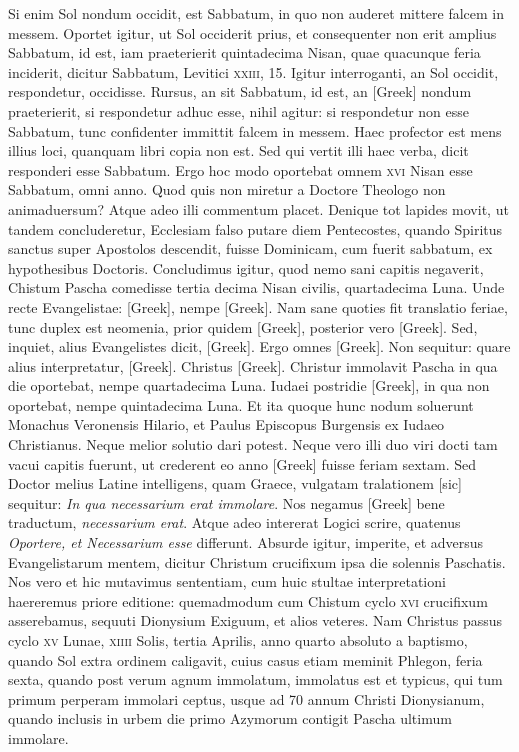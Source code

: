 Si enim Sol nondum occidit, est Sabbatum,
in quo non auderet mittere falcem in messem.
Oportet igitur,
ut Sol occiderit prius, et consequenter non erit amplius Sabbatum,
id est, iam praeterierit quintadecima Nisan, quae quacunque feria
inciderit, dicitur Sabbatum, Levitici \textsc{xxiii}, 15.
Igitur interroganti,
an Sol occidit, respondetur, occidisse.
Rursus, an sit Sabbatum, id
est, an \textgreek{[Greek]} nondum praeterierit, si respondetur adhuc
esse, nihil agitur: si respondetur non esse Sabbatum, tunc confidenter
immittit falcem in messem.
Haec profector est mens illius loci,
quanquam libri copia non est.
Sed qui vertit illi haec verba, dicit responderi
esse Sabbatum.
Ergo hoc modo oportebat omnem \textsc{xvi}
Nisan esse Sabbatum, omni anno.
Quod quis non miretur a Doctore
Theologo non animaduersum?
Atque adeo illi commentum
placet.
Denique tot lapides movit, ut tandem concluderetur, Ecclesiam
falso putare diem Pentecostes, quando Spiritus sanctus super
Apostolos descendit, fuisse Dominicam, cum fuerit sabbatum, ex
hypothesibus Doctoris.
Concludimus igitur, quod nemo sani capitis
negaverit, Chistum Pascha comedisse tertia decima Nisan civilis,
quartadecima Luna.
Unde recte Evangelistae: \textgreek{[Greek]},
nempe \textgreek{[Greek]}.
Nam sane quoties fit translatio feriae,
tunc duplex est neomenia, prior quidem \textgreek{[Greek]}, posterior vero
\textgreek{[Greek]}.
Sed, inquiet, alius Evangelistes dicit, \textgreek{[Greek]}.
Ergo omnes \textgreek{[Greek]}.
Non sequitur: quare alius interpretatur, \textgreek{[Greek]}.
Christus \textgreek{[Greek]}.
Christur immolavit Pascha in qua die
oportebat, nempe quartadecima Luna.
Iudaei postridie \textgreek{[Greek]},
in qua non oportebat, nempe quintadecima Luna.
Et ita quoque
hunc nodum soluerunt Monachus Veronensis Hilario, et Paulus
Episcopus Burgensis ex Iudaeo Christianus.
Neque melior solutio
dari potest.
Neque vero illi duo viri docti tam vacui capitis fuerunt,
ut crederent eo anno \textgreek{[Greek]} fuisse feriam sextam.
Sed Doctor melius Latine intelligens, quam Graece,
 vulgatam tralationem [sic]
sequitur: \textit{In qua necessarium erat immolare}.
Nos negamus
\textgreek{[Greek]} bene traductum, \textit{necessarium erat}.
Atque adeo intererat Logici
scrire, quatenus \textit{Oportere, et Necessarium esse} differunt.
Absurde igitur, imperite, et adversus Evangelistarum mentem, dicitur
Christum crucifixum ipsa die solennis Paschatis.
Nos vero et
hic mutavimus sententiam, cum huic stultae interpretationi haereremus
priore editione: quemadmodum cum Chistum cyclo \textsc{xvi} crucifixum
asserebamus, sequuti Dionysium Exiguum, et alios veteres.
Nam Christus passus cyclo \textsc{xv} Lunae, \textsc{xiiii} Solis,
 tertia Aprilis,
anno quarto absoluto a baptismo, quando Sol extra ordinem caligavit,
cuius casus etiam meminit Phlegon, feria sexta, quando
post verum agnum immolatum, immolatus est et typicus, qui tum
primum perperam immolari ceptus, usque ad 70 annum Christi
Dionysianum, quando inclusis in urbem die primo Azymorum
contigit Pascha ultimum immolare.

